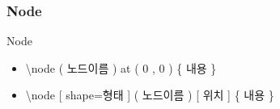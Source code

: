 \documentclass[ aspectratio=169,  12pt,blue,xcolor=pdftex,dvipsnames,table,handout,notes]{beamer}
\begin{document}
		\begin{frame}[t]
		\frametitle{ Node}

				\begin{block}{ Node }
				\begin {itemize}
				\item[] \textbackslash node ( 노드이름 ) at ( 0 , 0 ) \{ 내용 \}
				\item[] \textbackslash node [ shape=형태 ] ( 노드이름 ) [ 위치 ] \{ 내용 \}

				\end {itemize}
				\end{block}


		\end{frame}
\end{document}
